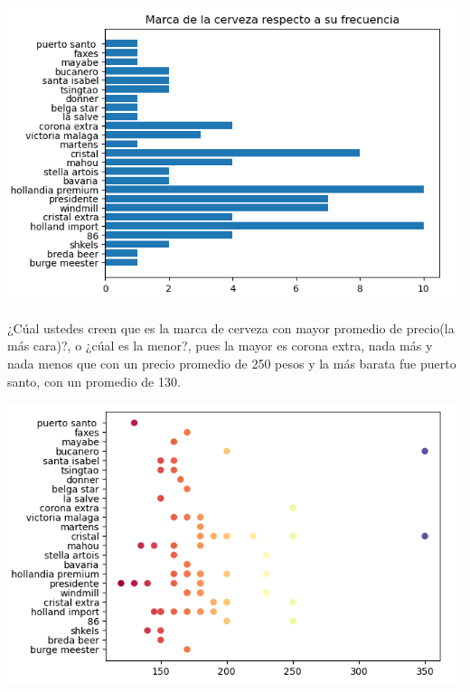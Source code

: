 \documentclass[a4paper,11pt]{article}
\begin{document}
\begin{minipage}{0.5\textwidth}
  \begin{center}
    \includegraphics[width=1.8\textwidth]{marca de cerve.png}
  \end{center}
\end{minipage}
\par\vspace{2pt}
¿Cúal ustedes creen que es la marca de cerveza con mayor promedio de precio(la más cara)?, o ¿cúal es la menor?, pues la mayor es corona extra, nada más y nada menos que con un precio promedio de 250 pesos y la más barata fue puerto santo, con un promedio de 130.
\par\vspace{2pt}
\begin{minipage}{0.5\textwidth}
  \begin{center}
    \includegraphics[width=1.7\textwidth]{marca y precio cerveza.png}
  \end{center}
\end{minipage}
\end{document}
